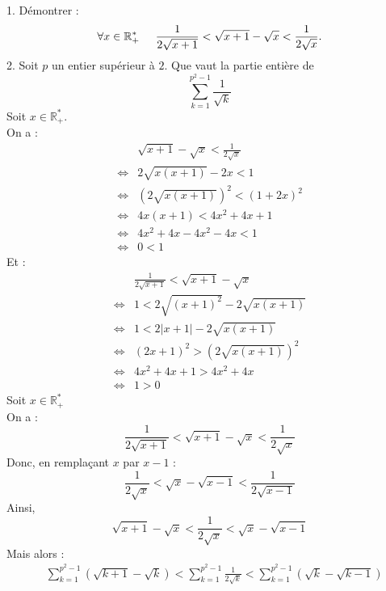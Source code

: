 \documentclass[11pt]{article}
\begin{document}
\begin{exercice}{}{}
    1. Démontrer : 
    \begin{equation*}
        \forall{x\in\mathbb{R}^*_+}\hspace{0.5cm}\frac{1}{2\sqrt{x+1}}<\sqrt{x+1}-\sqrt{x}<\frac{1}{2\sqrt{x}}.
    \end{equation*}
    2. Soit $p$ un entier supérieur à $2$. Que vaut la partie entière de
    \begin{equation*}
        \sum_{k=1}^{p^2-1}{\frac{1}{\sqrt{k}}}
    \end{equation*}
    \tcblower
     Soit $x\in\mathbb{R}^*_+$.\\
    On a :
    \begin{align*}
        &\sqrt{x+1}-\sqrt{x}<\frac{1}{2\sqrt{x}}\\
        \iff&2\sqrt{x(x+1)}-2x<1\\
        \iff&(2\sqrt{x(x+1)})^2<(1+2x)^2\\
        \iff&4x(x+1)<4x^2+4x+1\\
        \iff&4x^2+4x-4x^2-4x<1\\
        \iff&0<1
    \end{align*}
    Et :
    \begin{align*}
        &\frac{1}{2\sqrt{x+1}}<\sqrt{x+1}-\sqrt{x}\\
        \iff&1<2\sqrt{(x+1)^2}-2\sqrt{x(x+1)}\\
        \iff&1<2|x+1|-2\sqrt{x(x+1)}\\
        \iff&(2x+1)^2>(2\sqrt{x(x+1)})^2\\
        \iff&4x^2+4x+1>4x^2+4x\\
        \iff&1>0
    \end{align*}
    Soit $x\in\mathbb{R}^*_+$\\
    On a :
    \begin{equation*}
        \frac{1}{2\sqrt{x+1}}<\sqrt{x+1}-\sqrt{x}<\frac{1}{2\sqrt{x}}
    \end{equation*}
    Donc, en remplaçant $x$ par $x-1$ :
    \begin{equation*}
        \frac{1}{2\sqrt{x}}<\sqrt{x}-\sqrt{x-1}<\frac{1}{2\sqrt{x-1}}
    \end{equation*}
    Ainsi,
    \begin{equation*}
        \sqrt{x+1}-\sqrt{x}<\frac{1}{2\sqrt{x}}<\sqrt{x}-\sqrt{x-1}
    \end{equation*}
    Mais alors :
    \begin{align*}
        &\sum^{p^2-1}_{k=1}{\left(\sqrt{k+1}-\sqrt{k}\right)}<\sum^{p^2-1}_{k=1}{\frac{1}{2\sqrt{k}}}<\sum^{p^2-1}_{k=1}{\left(\sqrt{k}-\sqrt{k-1}\right)}\\

\end{align*}
\end{exercice}
\end{document}
